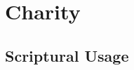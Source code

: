 \section{Charity}
	\label{CHARITY}
	




	


\subsection{Scriptural Usage} %
	\label{CHARITY-SCRIPTURES}

